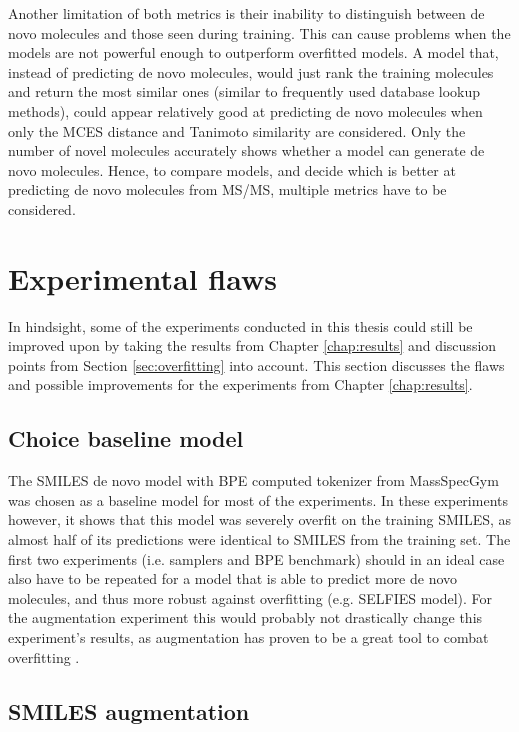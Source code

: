 Another limitation of both metrics is their inability to distinguish between de novo molecules and those seen during training.
This can cause problems when the models are not powerful enough to outperform overfitted models.
A model that, instead of predicting de novo molecules, would just rank the training molecules and return the most similar ones (similar to frequently used database lookup methods), could appear relatively good at predicting de novo molecules when only the \ac{MCES} distance and Tanimoto similarity are considered.
Only the number of novel molecules accurately shows whether a model can generate de novo molecules.
Hence, to compare models, and decide which is better at predicting de novo molecules from \ac{MS/MS}, multiple metrics have to be considered.

\section{Experimental flaws}

In hindsight, some of the experiments conducted in this thesis could still be improved upon by taking the results from Chapter \ref{chap:results} and discussion points from Section \ref{sec:overfitting} into account.
This section discusses the flaws and possible improvements for the experiments from Chapter \ref{chap:results}.

\subsection{Choice baseline model}

The SMILES de novo model with \ac{BPE} computed tokenizer from MassSpecGym was chosen as a baseline model for most of the experiments. 
In these experiments however, it shows that this model was severely overfit on the training SMILES, as almost half of its predictions were identical to SMILES from the training set.
The first two experiments (i.e. samplers and \ac{BPE} benchmark) should in an ideal case also have to be repeated for a model that is able to predict more de novo molecules, and thus more robust against overfitting (e.g. SELFIES model).
For the augmentation experiment this would probably not drastically change this experiment's results, as augmentation has proven to be a great tool to combat overfitting \cite{shorten2019survey}.

\subsection{SMILES augmentation}

